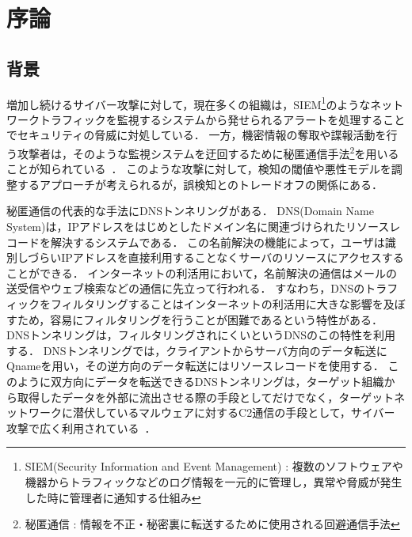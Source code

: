 \section{序論}
\subsection{背景}
増加し続けるサイバー攻撃に対して，現在多くの組織は，SIEM\footnote{SIEM(Security Information and Event Management) : 複数のソフトウェアや機器からトラフィックなどのログ情報を一元的に管理し，異常や脅威が発生した時に管理者に通知する仕組み}のようなネットワークトラフィックを監視するシステムから発せられるアラートを処理することでセキュリティの脅威に対処している．
一方，機密情報の奪取や諜報活動を行う攻撃者は，そのような監視システムを迂回するために秘匿通信手法\footnote{秘匿通信 : 情報を不正・秘密裏に転送するために使用される回避通信手法}を用いることが知られている~\cite{mitre-custom-c2}．
このような攻撃に対して，検知の閾値や悪性モデルを調整するアプローチが考えられるが，誤検知とのトレードオフの関係にある．

秘匿通信の代表的な手法にDNSトンネリングがある．
DNS(Domain Name System)は，IPアドレスをはじめとしたドメイン名に関連づけられたリソースレコードを解決するシステムである．
この名前解決の機能によって，ユーザは識別しづらいIPアドレスを直接利用することなくサーバのリソースにアクセスすることができる．
インターネットの利活用において，名前解決の通信はメールの送受信やウェブ検索などの通信に先立って行われる．
すなわち，DNSのトラフィックをフィルタリングすることはインターネットの利活用に大きな影響を及ぼすため，容易にフィルタリングを行うことが困難であるという特性がある．
DNSトンネリングは，フィルタリングされにくいというDNSのこの特性を利用する．
DNSトンネリングでは，クライアントからサーバ方向のデータ転送にQnameを用い，その逆方向のデータ転送にはリソースレコードを使用する．
このように双方向にデータを転送できるDNSトンネリングは，ターゲット組織から取得したデータを外部に流出させる際の手段としてだけでなく，ターゲットネットワークに潜伏しているマルウェアに対するC2通信の手段として，サイバー攻撃で広く利用されている~\cite{frameworkpos, bondupdater, bernhardpos, multigrainpos, pisloader, denis, dnsmessenger, udpos}．

